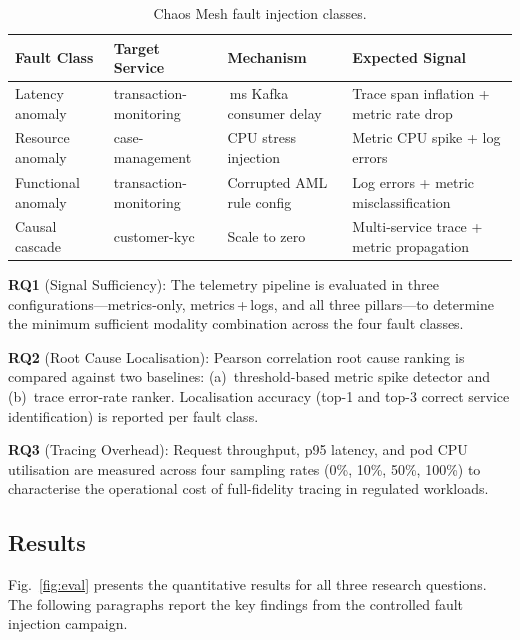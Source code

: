 \documentclass[a4paper]{lipics-v2021}
\begin{document}
\begin{table}[t]
\caption{Chaos Mesh fault injection classes.}
\label{tab:faults}
\small
\begin{tabular}{>{\raggedright\arraybackslash}p{2.4cm}
                >{\raggedright\arraybackslash}p{3.1cm}
                >{\raggedright\arraybackslash}p{2.9cm}
                >{\raggedright\arraybackslash}p{3.5cm}}
\toprule
\textbf{Fault Class} & \textbf{Target Service} & \textbf{Mechanism} & \textbf{Expected Signal}\\
\midrule
Latency anomaly    & transaction-monitoring & 500\,ms Kafka consumer delay & Trace span inflation + metric rate drop\\
Resource anomaly   & case-management        & CPU stress injection         & Metric CPU spike + log errors\\
Functional anomaly & transaction-monitoring & Corrupted AML rule config    & Log errors + metric misclassification\\
Causal cascade     & customer-kyc           & Scale to zero                & Multi-service trace + metric propagation\\
\bottomrule
\end{tabular}
\end{table}

\textbf{RQ1} (Signal Sufficiency): The telemetry pipeline is evaluated in three
configurations---metrics-only, metrics\,+\,logs, and all three
pillars---to determine the minimum sufficient modality combination across the four
fault classes.

\textbf{RQ2} (Root Cause Localisation): Pearson correlation root cause ranking is
compared against two baselines: (a)~threshold-based metric spike detector and
(b)~trace error-rate ranker. Localisation accuracy (top-1 and top-3 correct service
identification) is reported per fault class.

\textbf{RQ3} (Tracing Overhead): Request throughput, p95 latency, and pod CPU
utilisation are measured across four sampling rates (0\%, 10\%, 50\%, 100\%) to
characterise the operational cost of full-fidelity tracing in regulated workloads.

\subsection{Results}

Fig.~\ref{fig:eval} presents the quantitative results for all three research
questions. The following paragraphs report the key findings from the controlled
fault injection campaign.
\end{document}

